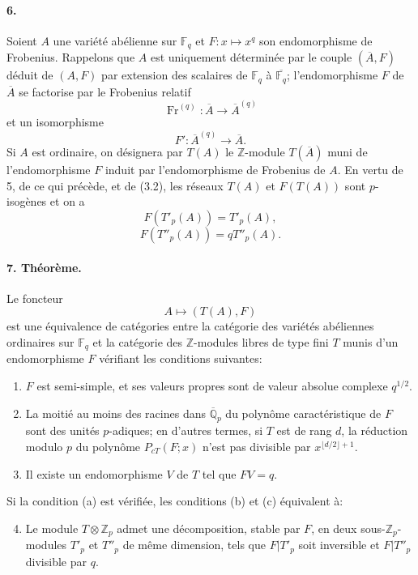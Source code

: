\documentclass[10pt]{article}
\newcommand{\Fq}{\mathbb F_q}
\newcommand{\Q}{\mathbb Q}
\newcommand{\Z}{\mathbb Z}
\newcommand{\Fr}{\operatorname{Fr}}
\begin{document}
\paragraph{6.} Soient $A$ une variété abélienne sur $\Fq$ et $F:x\mapsto x^q$ son endomorphisme de Frobenius. Rappelons que $A$ est uniquement déterminée par le couple $(\overline A,F)$ déduit de $(A,F)$ par extension des scalaires de $\Fq$ à $\overline{\Fq}$; l'endomorphisme $F$ de $\overline A$ se factorise par le Frobenius relatif
\[
\Fr^{(q)}:\overline A\longrightarrow \overline A^{(q)}
\]
et un isomorphisme
\[
F':\overline A^{(q)}\longrightarrow\overline A.
\]
Si $A$ est ordinaire, on désignera par $T(A)$ le $\Z$-module $T(\overline A)$ muni de l'endomorphisme $F$ induit par l'endomorphisme de Frobenius de $A$. En vertu de 5, de ce qui précède, et de (3.2), les réseaux $T(A)$ et $F(T(A))$ sont $p$-isogènes et on a
\[
\tag{6.1}
F(T'_p(A))=T'_p(A),
\]
\[
\tag{6.2}
F(T''_p(A))=qT''_p(A).
\]

\paragraph{7. Théorème.} Le foncteur
\[
A\longmapsto (T(A),F)
\]
est une équivalence de catégories entre la catégorie des variétés abéliennes ordinaires sur $\Fq$ et la catégorie des $\Z$-modules libres de type fini $T$ munis d'un endomorphisme $F$ vérifiant les conditions suivantes:
\begin{enumerate}[label=(\alph*)]
\item $F$ est semi-simple, et ses valeurs propres sont de valeur absolue complexe $q^{1/2}$.
\item La moitié au moins des racines dans $\overline{\Q}_p$ du polynôme caractéristique de $F$ sont des unités $p$-adiques; en d'autres termes, si $T$ est de rang $d$, la réduction modulo $p$ du polynôme $P_{cT}(F;x)$ n'est pas divisible par $x^{\lfloor d/2\rfloor+1}$.
\item Il existe un endomorphisme $V$ de $T$ tel que $FV=q$.
\end{enumerate}
Si la condition (a) est vérifiée, les conditions (b) et (c) équivalent à:
\begin{enumerate}[label=(\alph*)]
\setcounter{enumi}{3}
\item Le module $T\otimes\Z_p$ admet une décomposition, stable par $F$, en deux sous-$\Z_p$-modules $T'_p$ et $T''_p$ de même dimension, tels que $F|T'_p$ soit inversible et $F|T''_p$ divisible par $q$.
\end{enumerate}
\end{document}
